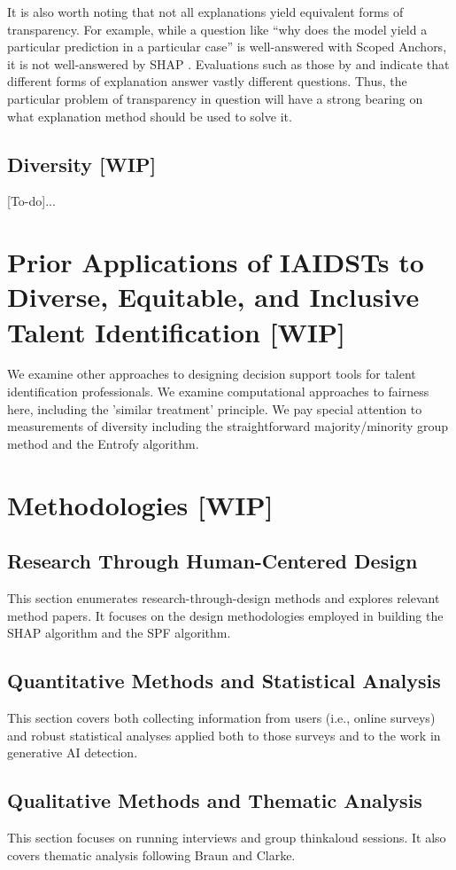It is also worth noting that not all explanations yield equivalent forms of transparency. For example, while a question like “why does the model yield a particular prediction in a particular case” is well-answered with Scoped Anchors, it is not well-answered by SHAP \cite{lundberg_unified_2017,ribeiro_anchors_2018}. Evaluations such as those by \textcite{binns_human_2022} and \textcite{rader_explanations_2018} indicate that different forms of explanation answer vastly different questions. Thus, the particular problem of transparency in question will have a strong bearing on what explanation method should be used to solve it.

\subsection{Diversity [WIP]}
[To-do]...

\section{Prior Applications of IAIDSTs to Diverse, Equitable, and Inclusive Talent Identification [WIP]}
We examine other approaches to designing decision support tools for talent identification professionals. We examine computational approaches to fairness here, including the 'similar treatment' principle. We pay special attention to measurements of diversity including the straightforward majority/minority group method and the Entrofy algorithm.

\section{Methodologies [WIP]}
\subsection{Research Through Human-Centered Design}
This section enumerates research-through-design methods and explores relevant method papers. It focuses on the design methodologies employed in building the SHAP algorithm and the SPF algorithm.

\subsection{Quantitative Methods and Statistical Analysis}
This section covers both collecting information from users (i.e., online surveys) and robust statistical analyses applied both to those surveys and to the work in generative AI detection.

\subsection{Qualitative Methods and Thematic Analysis}
This section focuses on running interviews and group thinkaloud sessions. It also covers thematic analysis following Braun and Clarke.

